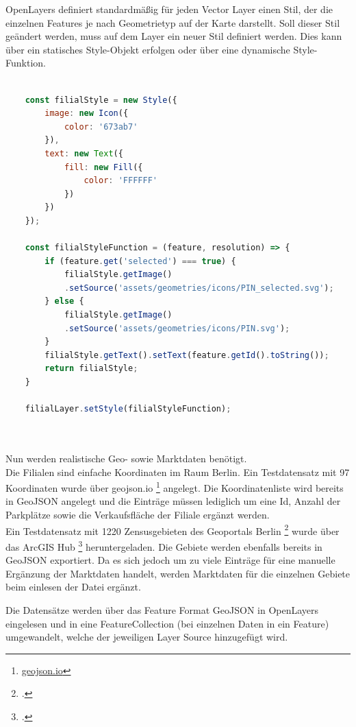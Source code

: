 OpenLayers definiert standardmäßig für jeden Vector Layer einen Stil, der die einzelnen Features je nach Geometrietyp auf der Karte darstellt. 
Soll dieser Stil geändert werden, muss auf dem Layer ein neuer Stil definiert werden.
Dies kann über ein statisches Style-Objekt erfolgen oder über eine dynamische Style-Funktion.

\begin{lstlisting}[language=JavaScript, label={code:filialStyle}, caption={Erstellen des Filialstyles}]
	
	const filialStyle = new Style({
		image: new Icon({
			color: '673ab7'
		}),
		text: new Text({
			fill: new Fill({
				color: 'FFFFFF'
			})	
		})
	});
	
	const filialStyleFunction = (feature, resolution) => {
		if (feature.get('selected') === true) {
			filialStyle.getImage()
			.setSource('assets/geometries/icons/PIN_selected.svg');
		} else {
			filialStyle.getImage()
			.setSource('assets/geometries/icons/PIN.svg');
		}
		filialStyle.getText().setText(feature.getId().toString());
		return filialStyle;
	}
	
	filialLayer.setStyle(filialStyleFunction);

	
\end{lstlisting}

Nun werden realistische Geo- sowie Marktdaten benötigt.\\
Die Filialen sind einfache Koordinaten im Raum Berlin.
Ein Testdatensatz mit 97 Koordinaten wurde über geojson.io \footnote{\href{geojson.io}{geojson.io}} angelegt.
Die Koordinatenliste wird bereits in GeoJSON angelegt und die Einträge müssen lediglich um eine Id, Anzahl der Parkplätze sowie die Verkaufsfläche der Filiale ergänzt werden.\\
Ein Testdatensatz mit 1220 Zensusgebieten des Geoportals Berlin \footcite{geoportal_berlin} wurde über das ArcGIS Hub \footcite{arcgis_verkehrszellen} heruntergeladen.
Die Gebiete werden ebenfalls bereits in GeoJSON exportiert.
Da es sich jedoch um zu viele Einträge für eine manuelle Ergänzung der Marktdaten handelt, werden Marktdaten für die einzelnen Gebiete beim einlesen der Datei ergänzt.

Die Datensätze werden über das Feature Format GeoJSON in OpenLayers eingelesen und in eine FeatureCollection (bei einzelnen Daten in ein Feature) umgewandelt, welche der jeweiligen Layer Source hinzugefügt wird.

